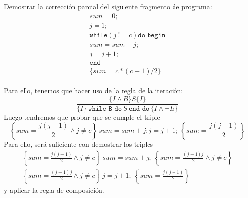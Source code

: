 \begin{ejercicio}
    Demostrar la corrección parcial del siguiente fragmento de programa:
    \begin{gather*}
        sum = 0;  \\
        j = 1; \\
        \texttt{while}(j\ != c) \texttt{do begin}\\
          sum = sum + j;\\
          j = j + 1;\\
          \texttt{end}\\
        \{sum = c*(c-1)/2\}
    \end{gather*}~\\

    Para ello, tenemos que hacer uso de la regla de la iteración: 
    \begin{equation*}
        \dfrac{\{I\land B\}S\{I\}}{\{I\}\ \texttt{while B do}\ S\ \texttt{end do}\ \{I\land \lnot B\}}
    \end{equation*}
    Luego tendremos que probar que se cumple el triple
    \begin{equation*}
        \left\{sum=\frac{j(j-1)}{2} \land j\neq c\right\}\ sum=sum+j;j=j+1;\ \left\{sum=\frac{j(j-1)}{2}\right\}
    \end{equation*}
    Para ello, será suficiente con demostrar los triples
    \begin{gather*}
        \left\{sum = \frac{j(j-1)}{2} \land j\neq c\right\}\ sum = sum + j;\ \left\{sum = \frac{(j+1)j}{2} \land j \neq c\right\} \\
        \left\{sum = \frac{(j+1)j}{2} \land j\neq c\right\}\ j=j+1;\ \left\{sum = \frac{j(j-1)}{2}\right\}
    \end{gather*}
    y aplicar la regla de composición.


\end{ejercicio}
